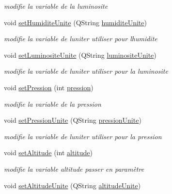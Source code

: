 \begin{DoxyCompactItemize}
\begin{DoxyCompactList}\small\item\em modifie la variable de la luminosite \end{DoxyCompactList}\item 
void \hyperlink{class_esp32_ae9b2704f36bcd246668354d0ac06ea35}{set\+Humidite\+Unite} (Q\+String \hyperlink{class_esp32_a90c1ea9a5598c16a7918205185aa9fd6}{humidite\+Unite})
\begin{DoxyCompactList}\small\item\em modifie la variable de l\textquotesingle{}uniter utiliser pour l\textquotesingle{}humidite \end{DoxyCompactList}\item 
void \hyperlink{class_esp32_a36450bcd23e7676d1f0a46e8bec31275}{set\+Luminosite\+Unite} (Q\+String \hyperlink{class_esp32_a67087c5b6b76b64f929dbc255a7d5441}{luminosite\+Unite})
\begin{DoxyCompactList}\small\item\em modifie la variable de l\textquotesingle{}uniter utiliser pour la luminosite \end{DoxyCompactList}\item 
void \hyperlink{class_esp32_a583358abbf0b279dabb5a2976f1783de}{set\+Pression} (int \hyperlink{class_esp32_a7ddfb5679b439b204a93f775cfa9d2fa}{pression})
\begin{DoxyCompactList}\small\item\em modifie la variable de la pression \end{DoxyCompactList}\item 
void \hyperlink{class_esp32_a3c6dd57f955aef0738c48be705538337}{set\+Pression\+Unite} (Q\+String \hyperlink{class_esp32_aad1ead1e2c830025af0eebcdb30bcafe}{pression\+Unite})
\begin{DoxyCompactList}\small\item\em modifie la variable de l\textquotesingle{}uniter utiliser pour la pression \end{DoxyCompactList}\item 
void \hyperlink{class_esp32_aeb2268155501f27e36e6a7c6caa15412}{set\+Altitude} (int \hyperlink{class_esp32_ab257f7aff043b4d60d963e1bfd1fe35f}{altitude})
\begin{DoxyCompactList}\small\item\em modifie la variable altitude passer en paramètre \end{DoxyCompactList}\item 
void \hyperlink{class_esp32_a69b0c6a1c0a31e043b715be3fc40ded1}{set\+Altitude\+Unite} (Q\+String \hyperlink{class_esp32_ad407a4a4139183be7c4293fb254c96d7}{altitude\+Unite})

\end{DoxyCompactItemize}
